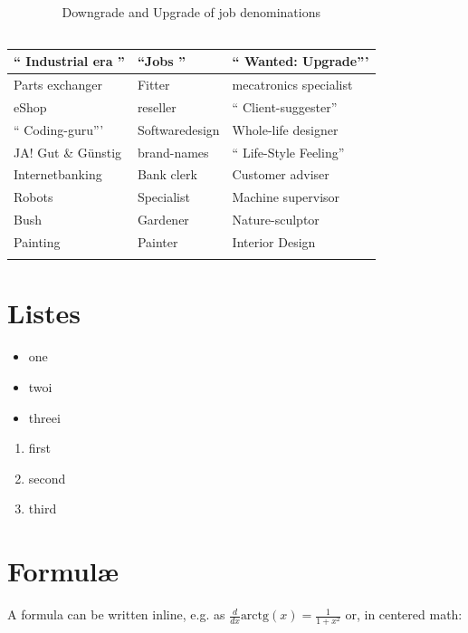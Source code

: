 \begin{table}[H]
\small
\centering
\begin{tabular}{p{5cm}|l|p{3cm}}
`` Industrial era '' &  ``Jobs '' & `` Wanted: Upgrade''' \\ \hline
Parts exchanger & Fitter & mecatronics specialist \\
eShop & reseller & `` Client-suggester'' \\
`` Coding-guru''' & Softwaredesign & Whole-life designer \\
JA! Gut \& Günstig & brand-names & `` Life-Style Feeling'' \\
Internetbanking & Bank clerk & Customer adviser \\
Robots & Specialist & Machine supervisor \\
Bush & Gardener & Nature-sculptor \\
Painting & Painter & Interior Design \\
 &  & \\
\end{tabular}
\caption[Downgrade and upgrade of job denominations]{Downgrade and Upgrade of job denominations \\ \ \ \ \textcite{DueckKo:2016}}
\label{tab:Downgrade and Upgrade of job denominations}
\end{table} 

\section{Listes}

\begin{itemize}
 \itemsep0pt
 \item one
 \item twoi
 \item threei
\end{itemize}

\begin{enumerate}
 \itemsep0pt
 \item first
 \item second
 \item third
\end{enumerate}


\section{Formulæ}

A formula can be written inline, e.g. as $ \frac{d}{dx}\mbox{arctg}(x) = \frac{1}{1+x^2}$ or, in centered math:

